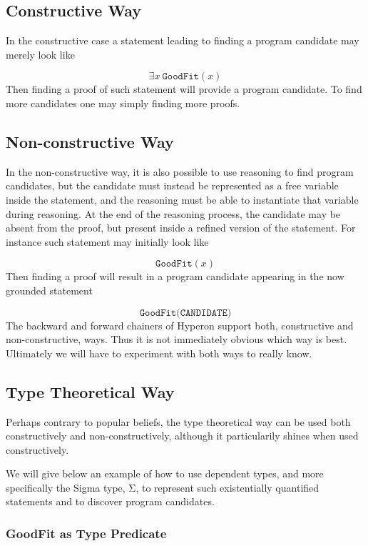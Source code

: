 \documentclass[]{report}
\begin{document}
\subsection{Constructive Way}

In the constructive case a statement leading to finding a program
candidate may merely look like

$$\exists x\ \texttt{GoodFit}(x)$$
Then finding a proof of such statement will provide a program
candidate.  To find more candidates one may simply finding more
proofs.

\subsection{Non-constructive Way}

In the non-constructive way, it is also possible to use reasoning to
find program candidates, but the candidate must instead be represented
as a free variable inside the statement, and the reasoning must be
able to instantiate that variable during reasoning.  At the end of the
reasoning process, the candidate may be absent from the proof, but
present inside a refined version of the statement.  For instance such
statement may initially look like

$$\texttt{GoodFit}(x)$$
Then finding a proof will result in a program candidate appearing in
the now grounded statement

$$\texttt{GoodFit(CANDIDATE)}$$
The backward and forward chainers of Hyperon support both,
constructive and non-constructive, ways.  Thus it is not immediately
obvious which way is best.  Ultimately we will have to experiment with
both ways to really know.

\subsection{Type Theoretical Way}
Perhaps contrary to popular beliefs, the type theoretical way can be
used both constructively and non-constructively, although it
particularily shines when used constructively.

We will give below an example of how to use dependent types, and more
specifically the Sigma type, Σ, to represent such existentially
quantified statements and to discover program candidates.

\subsubsection{GoodFit as Type Predicate}
\end{document}
